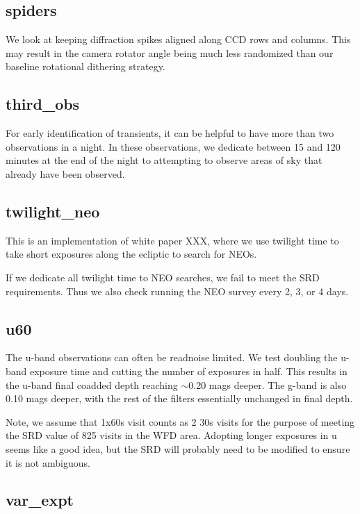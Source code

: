\subsection{spiders}

We look at keeping diffraction spikes aligned along CCD rows and columns. This may result in the camera rotator angle being much less randomized than our baseline rotational dithering strategy.

\subsection{third\_obs}

For early identification of transients, it can be helpful to have more than two observations in a night. In these observations, we dedicate between 15 and 120 minutes at the end of the night to attempting to observe areas of sky that already have been observed.

\subsection{twilight\_neo}

This is an implementation of white paper XXX, where we use twilight time to take short exposures along the ecliptic to search for NEOs. 

If we dedicate all twilight time to NEO searches, we fail to meet the SRD requirements. Thus we also check running the NEO survey every 2, 3, or 4 days.

\subsection{u60}\label{ss:u60}

The u-band observations can often be readnoise limited. We test doubling the u-band exposure time and cutting the number of exposures in half. This results in the u-band final coadded depth reaching $\sim$0.20 mags deeper. The g-band is also 0.10 mags deeper, with the rest of the filters essentially unchanged in final depth.

Note, we assume that 1x60s visit counts as 2 30s visits for the purpose of meeting the SRD value of 825 visits in the WFD area. Adopting longer exposures in u seems like a good idea, but the SRD will probably need to be modified to ensure it is not ambiguous.

\subsection{var\_expt}

